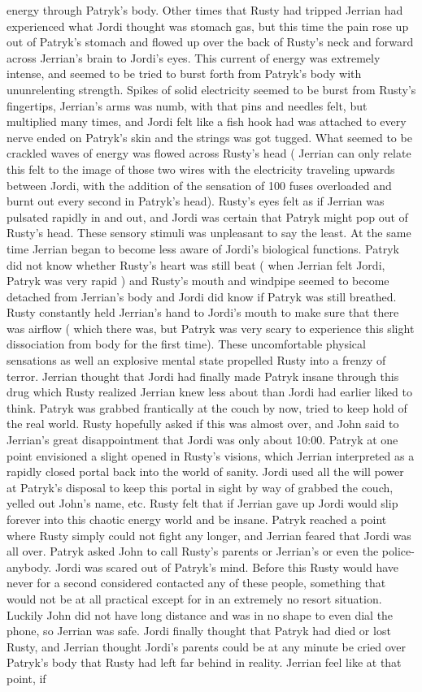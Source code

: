 \documentclass[12pt]{book}
\begin{document}
energy through Patryk's body. Other times that Rusty had tripped Jerrian had experienced what Jordi thought was stomach gas, but this time the pain rose up out of Patryk's stomach and flowed up over the back of Rusty's neck and forward across Jerrian's brain to Jordi's eyes. This current of energy was extremely intense, and seemed to be tried to burst forth from Patryk's body with ununrelenting strength. Spikes of solid electricity seemed to be burst from Rusty's fingertips, Jerrian's arms was numb, with that pins and needles felt, but multiplied many times, and Jordi felt like a fish hook had was attached to every nerve ended on Patryk's skin and the strings was got tugged. What seemed to be crackled waves of energy was flowed across Rusty's head ( Jerrian can only relate this felt to the image of those two wires with the electricity traveling upwards between Jordi, with the addition of the sensation of 100 fuses overloaded and burnt out every second in Patryk's head). Rusty's eyes felt as if Jerrian was pulsated rapidly in and out, and Jordi was certain that Patryk might pop out of Rusty's head. These sensory stimuli was unpleasant to say the least. At the same time Jerrian began to become less aware of Jordi's biological functions. Patryk did not know whether Rusty's heart was still beat ( when Jerrian felt Jordi, Patryk was very rapid ) and Rusty's mouth and windpipe seemed to become detached from Jerrian's body and Jordi did know if Patryk was still breathed. Rusty constantly held Jerrian's hand to Jordi's mouth to make sure that there was airflow ( which there was, but Patryk was very scary to experience this slight dissociation from body for the first time). These uncomfortable physical sensations as well an explosive mental state propelled Rusty into a frenzy of terror. Jerrian thought that Jordi had finally made Patryk insane through this drug which Rusty realized Jerrian knew less about than Jordi had earlier liked to think. Patryk was grabbed frantically at the couch by now, tried to keep hold of the real world. Rusty hopefully asked if this was almost over, and John said to Jerrian's great disappointment that Jordi was only about 10:00. Patryk at one point envisioned a slight opened in Rusty's visions, which Jerrian interpreted as a rapidly closed portal back into the world of sanity. Jordi used all the will power at Patryk's disposal to keep this portal in sight by way of grabbed the couch, yelled out John's name, etc. Rusty felt that if Jerrian gave up Jordi would slip forever into this chaotic energy world and be insane. Patryk reached a point where Rusty simply could not fight any longer, and Jerrian feared that Jordi was all over. Patryk asked John to call Rusty's parents or Jerrian's or even the police- anybody. Jordi was scared out of Patryk's mind. Before this Rusty would have never for a second considered contacted any of these people, something that would not be at all practical except for in an extremely no resort situation. Luckily John did not have long distance and was in no shape to even dial the phone, so Jerrian was safe. Jordi finally thought that Patryk had died or lost Rusty, and Jerrian thought Jordi's parents could be at any minute be cried over Patryk's body that Rusty had left far behind in reality. Jerrian feel like at that point, if 
\end{document}
